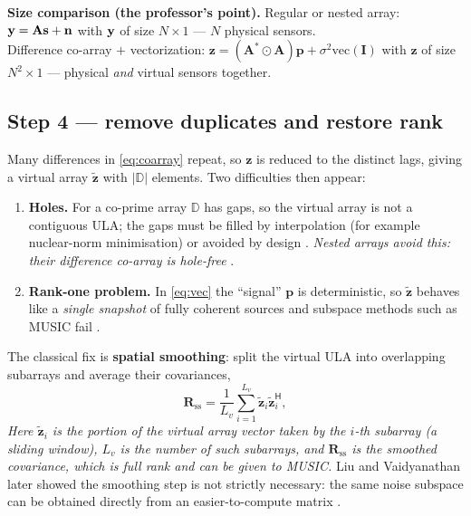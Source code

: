 \documentclass[11pt]{article}
\newcommand{\herm}{^{\mathsf{H}}}
\newcommand{\vn}{\mathbf{n}}\newcommand{\vz}{\mathbf{z}}\newcommand{\vp}{\mathbf{p}}
\newcommand{\mA}{\mathbf{A}}\newcommand{\mR}{\mathbf{R}}\newcommand{\mI}{\mathbf{I}}
\newcommand{\kr}{\odot}
\begin{document}
\begin{keybox}
\textbf{Size comparison (the professor's point).}
Regular or nested array: $\vy=\mA\vs+\vn$ with $\mathbf{y}$ of size $N\times1$ --- $N$ physical sensors.\\
Difference co-array $+$ vectorization: $\vz=(\mA^{*}\kr\mA)\vp+\sigma^{2}\mathrm{vec}(\mI)$ with
$\vz$ of size $N^{2}\times1$ --- physical \emph{and} virtual sensors together.
\end{keybox}

\subsection{Step 4 --- remove duplicates and restore rank}
Many differences in \eqref{eq:coarray} repeat, so $\vz$ is reduced to the distinct lags, giving a
virtual array $\tilde{\vz}$ with $|\mathbb{D}|$ elements. Two difficulties then appear:
\begin{enumerate}[leftmargin=1.5em,itemsep=1pt]
\item \textbf{Holes.} For a co-prime array $\mathbb{D}$ has gaps, so the virtual array is not a
      contiguous ULA; the gaps must be filled by interpolation (for example nuclear-norm
      minimisation) or avoided by design \cite{liu2017interp}. \emph{Nested arrays avoid this: their
      difference co-array is hole-free} \cite{pal2010nested}.
\item \textbf{Rank-one problem.} In \eqref{eq:vec} the ``signal'' $\vp$ is deterministic, so
      $\tilde{\vz}$ behaves like a \emph{single snapshot} of fully coherent sources and subspace
      methods such as MUSIC fail \cite{liu2015remarks}.
\end{enumerate}
The classical fix is \textbf{spatial smoothing}: split the virtual ULA into overlapping subarrays and
average their covariances,
\begin{equation}
\mR_{\mathrm{ss}}=\frac{1}{L_{v}}\sum_{i=1}^{L_{v}}\tilde{\vz}_{i}\tilde{\vz}_{i}\herm ,
\label{eq:ss}
\end{equation}
\textit{Here $\tilde{\vz}_{i}$ is the portion of the virtual array vector taken by the $i$-th
subarray (a sliding window), $L_{v}$ is the number of such subarrays, and $\mR_{\mathrm{ss}}$ is the
smoothed covariance, which is full rank and can be given to MUSIC.} Liu and Vaidyanathan later showed
the smoothing step is not strictly necessary: the same noise subspace can be obtained directly from
an easier-to-compute matrix \cite{liu2015remarks}.
\end{document}
